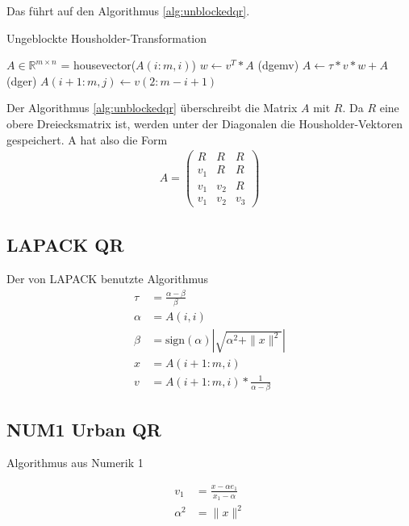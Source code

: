 Das führt auf den Algorithmus \ref{alg:unblockedqr}. 
\begin{algorithm}
	\caption{Ungeblockte Housholder-Transformation}
	\begin{algorithmic}
	\State $A \in \mathbb{R}^{m \times n}$
		\State [$v$, $\tau$] = housevector($A(i:m,i)$)
		\State $w \leftarrow v^T*A$ (dgemv)
		\State $ A \leftarrow \tau * v * w + A $ (dger)
			\State $A(i + 1 : m, j) \leftarrow v(2 : m - i + 1)$
		\EndIf
	\EndFor	
\end{algorithmic} 
\label{alg:unblockedqr}
\end{algorithm}

Der Algorithmus \ref{alg:unblockedqr} überschreibt die Matrix $A$ mit $R$. Da $R$ eine obere Dreiecksmatrix ist, werden unter der Diagonalen die Housholder-Vektoren gespeichert. A hat also die Form
\begin{align*}
	A = 
	\left(\begin{array}{ccc}
	R   &  R  & R \\ 
	v_1 &  R  & R \\ 
	v_1 & v_2 & R \\ 
	v_1 & v_2 & v_3
	\end{array} \right)
\end{align*}

\subsection{LAPACK QR}
Der von LAPACK benutzte Algorithmus \cite{DGEQR2}
\begin{align}
	\tau &= \frac{\alpha - \beta}{\beta} \\
	\alpha &= A(i,i)\\
	\beta &= \text{sign}(\alpha) \left|\sqrt{\alpha^2 + \|x\|^2}\right|\\
	x &= A(i+1:m,i)\\
	v &= A(i+1:m,i) * \frac{1}{\alpha - \beta}
\end{align}

\subsection{NUM1 Urban QR}
Algorithmus aus Numerik 1

\begin{align}
	v_1 &= \frac{x - \alpha e_1}{x_1 - \alpha}\\
	\alpha ^2 &= \|x\|^2 
\end{align}


